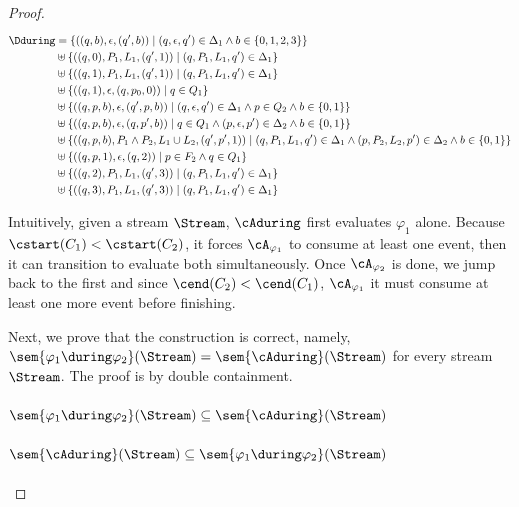 \begin{proof}
	
	$$\begin{aligned}[t] 		
		\Dduring & = \{((q,b), \epsilon, (q',b)) \mid (q,\epsilon,q') \in \Delta_1 \land b \in \{0, 1, 2, 3\}\} \\ 		
		& \uplus \{((q,0), P_1, L_1, (q', 1)) \mid (q,P_1, L_1,q') \in \Delta_1\} \\ 		
		& \uplus \{((q,1), P_1, L_1, (q', 1)) \mid (q,P_1, L_1,q') \in \Delta_1\} \\ 		
		& \uplus \{((q,1), \epsilon, (q, p_0, 0)) \mid q \in Q_1 \} \\ 		
		& \uplus \{((q, p, b), \epsilon, (q', p, b)) \mid (q, \epsilon, q') \in \Delta_1 \land p \in Q_2 \land b \in \{0, 1\}\}  \\ 		
		& \uplus \{((q, p, b), \epsilon, (q, p', b)) \mid q \in Q_1 \land (p, \epsilon, p') \in \Delta_2 \land b \in \{0, 1\}\}  \\ 		
		& \uplus \{((q, p, b), P_1 \land P_2, L_1 \cup L_2, (q', p', 1)) \mid (q, P_1, L_1, q') \in \Delta_1 \land (p, P_2, L_2, p') \in \Delta_2 \land b \in \{0, 1\}\} \\ 		
		& \uplus \{((q, p, 1), \epsilon, (q, 2)) \mid p \in F_2 \land q \in Q_1\} \\ 		
		& \uplus \{((q,2), P_1, L_1, (q', 3)) \mid (q,P_1, L_1,q') \in \Delta_1\} \\ 		
		& \uplus \{((q,3), P_1, L_1, (q', 3)) \mid (q,P_1, L_1,q') \in \Delta_1\} 	\end{aligned}$$
	
	Intuitively, given a stream $\Stream$, $\cAduring$ first evaluates $\varphi_1$ alone. Because $\cstart(C_1) < \cstart(C_2)$, it forces $\cA_{\varphi_1}$ to consume at least one event, then it can transition to evaluate both simultaneously. Once $\cA_{\varphi_2}$ is done, we jump back to the first and since $\cend(C_2) < \cend(C_1)$, $\cA_{\varphi_1}$ it must consume at least one more event before finishing.
	
	Next, we prove that the construction is correct, namely, $\sem{\varphi_1 \during \varphi_2}(\Stream) = \sem{\cAduring}(\Stream)$ for every stream $\Stream$. The proof is by double containment.
	
	\paragraph{$\sem{\varphi_1 \during \varphi_2}(\Stream) \subseteq \sem{\cAduring}(\Stream)$}
	
	\paragraph{$\sem{\cAduring}(\Stream) \subseteq \sem{\varphi_1 \during \varphi_2}(\Stream)$}
\end{proof}